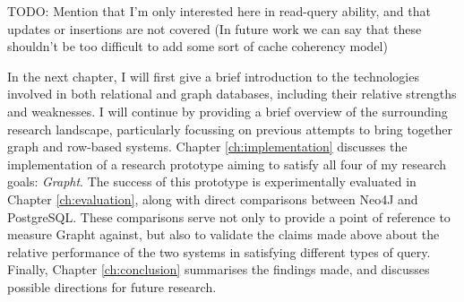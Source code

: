 TODO: Mention that I'm only interested here in read-query ability, and that updates or insertions are not covered
 (In future work we can say that these shouldn't be too difficult to add some sort of cache coherency model)



In the next chapter, I will first give a brief introduction to the
technologies involved in both relational and graph databases, including their
relative strengths and weaknesses. I will continue by providing a brief
overview of the surrounding research landscape, particularly  focussing on
previous attempts to bring together graph and row-based systems. Chapter
\ref{ch:implementation} discusses the implementation of a research prototype
aiming to satisfy all four of my research goals: \textit{Grapht}. The success of
this prototype is experimentally evaluated in Chapter \ref{ch:evaluation},
along with direct comparisons between Neo4J and PostgreSQL. These comparisons
serve not only to provide a point of reference to measure Grapht against, but
also to validate the claims made above about the relative performance of the
two systems in satisfying different types of query. Finally, Chapter
\ref{ch:conclusion} summarises the findings made, and discusses possible
directions for future research.
